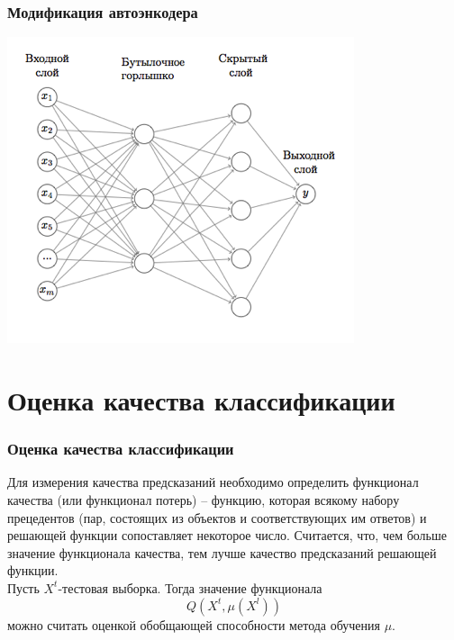 \documentclass{beamer}
\begin{document}
\begin{frame}
\frametitle{Модификация автоэнкодера}
\begin{center}
	\includegraphics[width=\linewidth,height=.7\textheight,keepaspectratio]{modified_encoder.png}
\end{center}
\end{frame}


\section{Оценка качества классификации}
\begin{frame}
\end{frame}

\begin{frame}
\frametitle{Оценка качества классификации}
Для измерения качества предсказаний необходимо определить функционал
качества (или функционал потерь) – функцию, которая всякому набору прецедентов (пар, состоящих из
объектов и соответствующих им ответов) и решающей функции сопоставляет
некоторое число. Считается, что, чем больше значение функционала качества, тем лучше качество предсказаний решающей функции.
\newline
\newline
\\
Пусть $X^t$-тестовая выборка. Тогда значение функционала $$Q(X^t,\mu(X^l))$$ можно считать оценкой обобщающей способности метода обучения $\mu$.
\end{frame}
\end{document}
